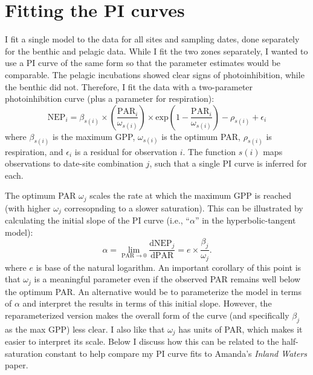 \documentclass[12pt]{article}
\begin{document}


\section*{Fitting the PI curves}

I fit a single model to the data for all sites and sampling dates, 
done separately for the benthic and pelagic data.
While I fit the two zones separately, 
I wanted to use a PI curve of the same form 
so that the parameter estimates would be comparable.
The pelagic incubations showed clear signs of photoinhibition,
while the benthic did not. 
Therefore, I fit the data with a two-parameter photoinhibition curve 
(plus a parameter for respiration):
%
\begin{equation} \label{eq:pi-curve}
    \text{NEP}_i = \beta_{s(i)} \times \left(\frac{\text{PAR}_i}{\omega_{s(i)}} \right) 
                    \times \text{exp} \left(1 - \frac{\text{PAR}_i}{\omega_{s(i)}} \right)
                      - \rho_{s(i)} + \epsilon_i
\end{equation}
%
where $\beta_{s(i)}$ is the maximum GPP, 
$\omega_{s(i)}$ is the optimum PAR, 
$\rho_{s(i)}$ is respiration,
and $\epsilon_i$ is a residual for observation $i$.
The function $s(i)$ maps observations to date-site combination $j$,
such that a single PI curve is inferred for each.

The optimum PAR $\omega_j$ scales the rate at which the maximum GPP is reached
(with higher $\omega_j$ corresopnding to a slower saturation).
This can be illustrated by calculating the initial slope of the PI curve 
(i.e., ``$\alpha$'' in the hyperbolic-tangent model):
%
\begin{equation} \label{eq:alpha}
    \alpha = \lim_{\text{PAR}\to 0} \frac{\text{d}\text{NEP}_j}{\text{d}\text{PAR}} = 
        e \times \frac{\beta_j}{\omega_j}.
\end{equation}
%
where $e$ is base of the natural logarithm.
An important corollary of this point is that $\omega_j$ is a meaningful parameter
even if the observed PAR remains well below the optimum PAR.
An alternative would be to parameterize the model in terms of $\alpha$ 
and interpret the results in terms of this initial slope. 
However, the reparameterized version makes the overall form of the curve 
(and specifically $\beta_j$ as the max GPP) less clear.
I also like that $\omega_j$ has units of PAR, 
which makes it easier to interpret its scale.
Below I discuss how this can be related to the half-saturation constant to help 
compare my PI curve fits to Amanda's \textit{Inland Waters} paper.
\end{document}
